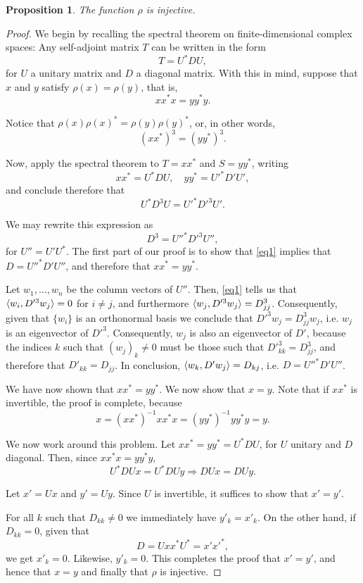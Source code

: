 \documentclass{article}
\theoremstyle{plain}
\newtheorem{prop}{Proposition}
\theoremstyle{nonumberplain}
\newtheorem{proof}{Proof}
\begin{document}
\begin{prop}
The function $\rho$ is injective.
\end{prop}

\begin{proof}
We begin by recalling the spectral theorem on finite-dimensional complex spaces: Any self-adjoint matrix $T$ can be written in the form
\[T = U^* D U,\]
for $U$ a unitary matrix and $D$ a diagonal matrix. With this in mind, suppose that $x$ and $y$ satisfy $\rho(x) = \rho(y)$, that is,
\[x x^* x = y y^* y.\]

Notice that $\rho(x) \rho(x)^* = \rho(y) \rho(y)^*$, or, in other words,
\[(x x^*)^3 = (y y^*)^3.\]

Now, apply the spectral theorem to $T = x x^*$ and $S = y y^*$, writing
\[x x^* = U^* D U, \quad y y^* = U'^* D' U',\]
and conclude therefore that
\[U^* D^3 U = U'^* D'^3 U'.\]

We may rewrite this expression as
\begin{equation}
D^3 = U''^* D'^3 U'',\label{eq1}
\end{equation}
for $U'' = U' U^*$. The first part of our proof is to show that \eqref{eq1} implies that $D = U''^* D' U''$, and therefore that $x x^* = y y^*$.

Let $w_1, \dots, w_n$ be the column vectors of $U''$. Then, \eqref{eq1} tells us that $\braket{w_i, D'^3 w_j} = 0$ for $i \neq j$, and furthermore $\braket{w_j, D'^3 w_j} = D_{jj}^3$. Consequently, given that $\{w_i\}$ is an orthonormal basis we conclude that $D'^3 w_j = D_{jj}^3 w_j$, i.e. $w_j$ is an eigenvector of $D'^3$. Consequently, $w_j$ is also an eigenvector of $D'$, because the indices $k$ such that $(w_j)_k \neq 0$ must be those such that $D'^3_{kk} = D_{jj}^3$, and therefore that $D'_{kk} = D_{jj}$. In conclusion, $\braket{w_k, D' w_j} = D_{kj}$, i.e. $D = U''^* D' U''$.

We have now shown that $x x^* = y y^*$. We now show that $x = y$. Note that if $x x^*$ is invertible, the proof is complete, because
\begin{equation}
x = (x x^*)^{-1} x x^* x = (y y^*)^{-1} y y^* y = y. 
\end{equation}

We now work around this problem. Let $x x^* = y y^* = U^* D U$, for $U$ unitary and $D$ diagonal. Then, since $x x^* x = y y^* y$,
\begin{equation}
U^* D U x = U^* D U y \Rightarrow D U x = D U y.
\end{equation}

Let $x' = U x$ and $y' = U y$. Since $U$ is invertible, it suffices to show that $x' = y'$.

For all $k$ such that $D_{kk} \neq 0$ we immediately have $y'_k = x'_k$. On the other hand, if $D_{kk} = 0$, given that
\begin{equation}
D = U x x^* U^* = x' x'^*,
\end{equation}
we get $x'_k = 0$. Likewise, $y'_k = 0$. This completes the proof that $x' = y'$, and hence that $x = y$ and finally that $\rho$ is injective.
\end{proof}
\end{document}
